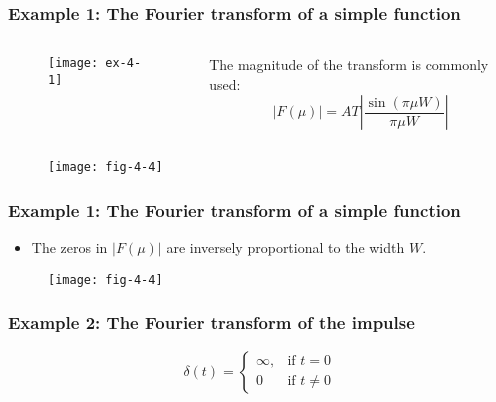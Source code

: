 \begin{frame}
\frametitle{Example 1: The Fourier transform of a simple function}
\begin{columns}
\begin{column}{.5\textwidth}
\begin{figure}
\centering
\texttt{[image: ex-4-1]}
\end{figure}
\end{column}
\begin{column}{.5\textwidth}
The magnitude of the transform is commonly used:
\begin{equation}
|F(\mu)| = AT\left | \dfrac{\sin(\pi \mu W)}{\pi\mu W} \right |
\end{equation}
\end{column}
\end{columns}
\begin{figure}
\centering
\texttt{[image: fig-4-4]}
\end{figure}
\end{frame}


\begin{frame}
\frametitle{Example 1: The Fourier transform of a simple function}
\begin{itemize}
\item The zeros in $|F(\mu)|$ are inversely proportional to the width $W$.
\end{itemize}
\begin{figure}
\centering
\texttt{[image: fig-4-4]}
\end{figure}
\end{frame}


\begin{frame}
\frametitle{Example 2: The Fourier transform of the impulse}
\begin{equation*}
\delta(t) = \left \{
\begin{array}{ll}
\infty, & \text{if } t=0\\
0		& \text{if } t\neq 0
\end{array}
\right .
\end{equation*}
\end{frame}


